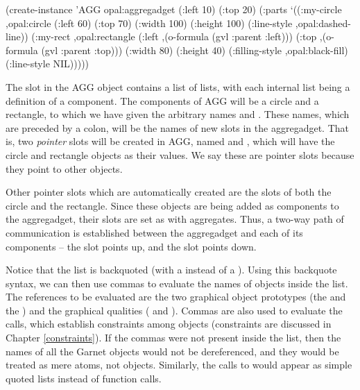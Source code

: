 \begin{programexample}
(create-instance 'AGG opal:aggregadget
   (:left 10) (:top 20)
   (:parts
    `((:my-circle ,opal:circle
                  (:left 60) (:top 70)
                  (:width 100) (:height 100)
                  (:line-style ,opal:dashed-line))
      (:my-rect ,opal:rectangle
                (:left ,(o-formula (gvl :parent :left)))
                (:top ,(o-formula (gvl :parent :top)))
                (:width 80) (:height 40)
                (:filling-style ,opal:black-fill)
                (:line-style NIL)))))
\end{programexample}

The  slot in the AGG object contains
a list of lists, with each internal list being a definition of a component.
The components of AGG will be a circle and a rectangle, to which we
have given the arbitrary names  and .
These names, which are preceded by a colon, will be the names of new
slots in the aggregadget.  That is, two {\it pointer} slots will be
created in AGG, named  and , which will
have the circle and rectangle objects as their values.  We say these are
pointer slots because they point to other objects.

Other pointer slots which are automatically created are the
 slots of both the circle and the rectangle.  Since these
objects are being added as components to the aggregadget, their
 slots are set as with aggregates.  Thus, a two-way path
of communication is established between the aggregadget and each of
its components -- the  slot points up, and the
 slot points down.

Notice that the  list is backquoted
(with a  instead of a ).  Using this backquote syntax, we can then
use commas to evaluate the names of objects inside the list.  The
references to be evaluated are the two graphical object prototypes (the
 and the ) and the graphical
qualities ( and ).
Commas are also used to evaluate the  calls, which
establish constraints among objects (constraints are discussed
in Chapter \ref{constraints}).  If the commas were not present inside
the  list, then the names of all the Garnet objects would not be
dereferenced, and they would be treated as mere atoms, not objects.
Similarly, the calls to  would appear as simple quoted
lists instead of function calls.

